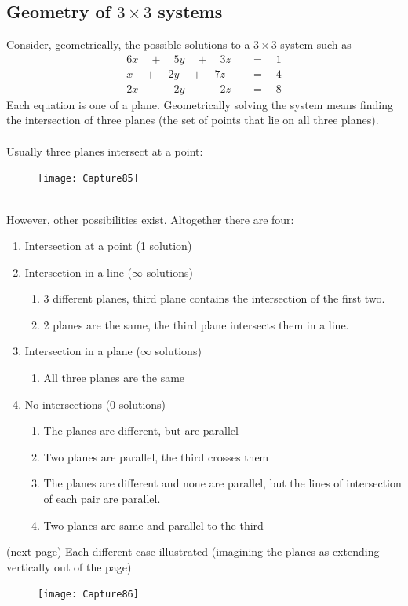 \documentclass{report}
\begin{document}
\subsection{Geometry of $3\times3$ systems} %
Consider, geometrically, the possible solutions to a $3\times3$ system such as
\begin{align*}
6x\quad+\quad5y\quad+\quad3z\quad&=\quad1\\
x\quad+\quad2y\quad+\quad7z\quad&=\quad4\\
2x\quad-\quad2y\quad-\quad2z\quad&=\quad8
\end{align*}
Each equation is one of a plane. Geometrically solving the system means finding the 
intersection of three planes (the set of points that
lie on all three planes).\\
\vspace{1mm}\\
Usually three planes intersect at a point:
\begin{figure}[h]
\texttt{[image: Capture85]}\\
\centering
\end{figure}\\
However, other possibilities exist. Altogether there are four:
\begin{enumerate}
\item Intersection at a point (1 solution)
\item Intersection in a line ($\infty$ solutions)
\begin{enumerate}
\item 3 different planes, third plane contains the intersection of the first two.
\item 2 planes are the same, the third plane intersects them in a line.
\end{enumerate}
\item Intersection in a plane ($\infty$ solutions)
\begin{enumerate}
\item All three planes are the same
\end{enumerate}
\item No intersections (0 solutions)
\begin{enumerate}
\item The planes are different, but are parallel
\item Two planes are parallel, the third crosses them
\item The planes are different and none are parallel, but the lines of intersection 
of each pair are parallel.
\item Two planes are same and parallel to the third
\end{enumerate}
\end{enumerate}
(next page)
\newpage
\noindent Each different case illustrated (imagining the planes as extending 
vertically out of the page)
\begin{figure}[h]
\texttt{[image: Capture86]}\\
\centering
\end{figure}
\newpage
\end{document}
